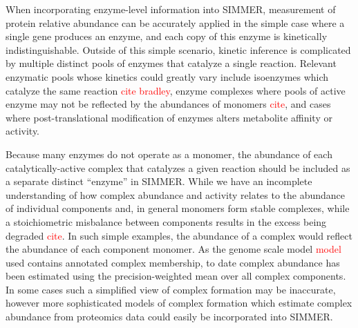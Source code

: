 When incorporating enzyme-level information into SIMMER, measurement of protein relative abundance can be accurately applied in the simple case where a single gene produces an enzyme, and each copy of this enzyme is kinetically indistinguishable. Outside of this simple scenario, kinetic inference is complicated by multiple distinct pools of enzymes that catalyze a single reaction. Relevant enzymatic pools whose kinetics could greatly vary include isoenzymes which catalyze the same reaction \textcolor{red}{cite bradley}, enzyme complexes where pools of active enzyme may not be reflected by the abundances of monomers \textcolor{red}{cite}, and cases where post-translational modification of enzymes alters metabolite affinity or activity. 

Because many enzymes do not operate as a monomer, the abundance of each catalytically-active complex that catalyzes a given reaction should be included as a separate distinct ``enzyme'' in SIMMER. While we have an incomplete understanding of how complex abundance and activity relates to the abundance of individual components and, in general monomers form stable complexes, while a stoichiometric misbalance between components results in the excess being degraded \textcolor{red}{cite}. In such simple examples, the abundance of a complex would reflect the abundance of each component monomer.  As the genome scale model \textcolor{red}{model} used contains annotated complex membership, to date complex abundance has been estimated using the precision-weighted mean over all complex components. In some cases such a simplified view of complex formation may be inaccurate, however more sophisticated models of complex formation which estimate complex abundance from proteomics data could easily be incorporated into SIMMER.
 
